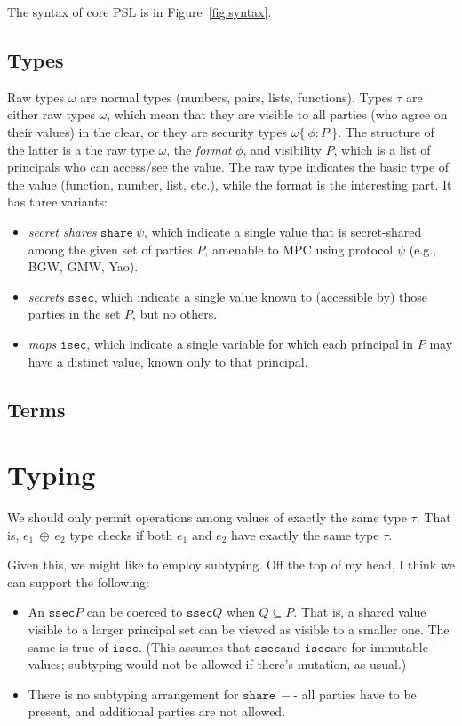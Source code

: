\documentclass[10pt]{article}
\newcommand{\ssec}{\ensuremath{\mathtt{ssec}}}
\newcommand{\isec}{\ensuremath{\mathtt{isec}}}
\newcommand{\sshare}[1]{\ensuremath{\mathtt{share}~{#1}}}
\newcommand{\sectyp}[3]{\ensuremath{{#1} \{~{#2}:{#3}~\}}}
\newcommand{\ebinop}[2]{\ensuremath{{#1}~\oplus~{#2}}}
\begin{document}
The syntax of core PSL is in Figure~\ref{fig:syntax}.

\subsection{Types}

Raw types $\omega$ are normal types (numbers, pairs, lists,
functions). Types $\tau$ are either raw types $\omega$, which mean
that they are visible to all parties (who agree on their values) in
the clear, or they are security types $\sectyp{\omega}{\phi}{P}$. The
structure of the latter is a the raw type $\omega$, the \emph{format}
$\phi$, and visibility $P$, which is a list of principals who can
access/see the value.  The raw type indicates the basic type of the
value (function, number, list, etc.), while the format is the
interesting part. It has three variants:
\begin{itemize}
\item \emph{secret shares} $\sshare\psi$, which indicate a single
  value that is secret-shared among the given set of parties $P$,
  amenable to MPC using protocol $\psi$ (e.g., BGW, GMW, Yao).
\item \emph{secrets} \ssec, which indicate a single value known to
  (accessible by) those parties in the set $P$, but no others.
\item \emph{maps} \isec, which indicate a single variable for which
  each principal in $P$ may have a distinct value, known only to that
  principal. 
\end{itemize}

\subsection{Terms}



\section{Typing}

We should only permit operations among values of exactly the same type
$\tau$. That is, $\ebinop{e_1}{e_2}$ type checks if both $e_1$ and
$e_2$ have exactly the same type $\tau$.

Given this, we might like to employ subtyping. Off the top of my
head, I think we can support the following:
\begin{itemize}
\item An \ssec $P$ can be coerced to \ssec $Q$ when $Q \subseteq
  P$. That is, a shared value visible to a larger principal set can be
  viewed as visible to a smaller one. The same is true of \isec. (This
  assumes that \ssec and \isec are for immutable values; subtyping
  would not be allowed if there's mutation, as usual.)
\item There is no subtyping arrangement for \sshare -- all parties have
  to be present, and additional parties are not allowed.
\end{itemize}
\end{document}
